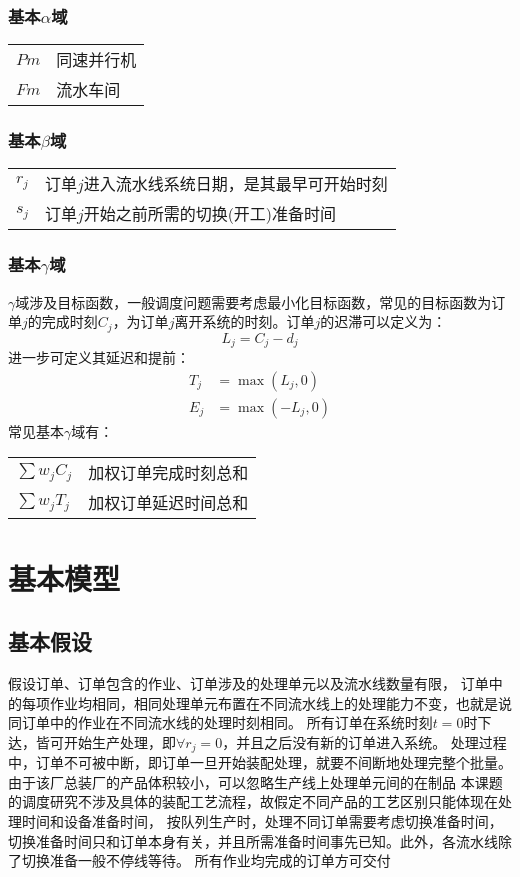 \subsubsection{基本$\alpha$域}
\begin{supertabular}{ll}
$Pm$ & 同速并行机\\
$Fm$ & 流水车间\\
\end{supertabular}

\subsubsection{基本$\beta$域}
\begin{supertabular}{ll}
$r_j$ & 订单$j$进入流水线系统日期，是其最早可开始时刻\\
$s_j$ & 订单$j$开始之前所需的切换(开工)准备时间\\
\end{supertabular}

\subsubsection{基本$\gamma$域}
$\gamma$域涉及目标函数，一般调度问题需要考虑最小化目标函数，常见的目标函数为订单$j$的完成时刻$C_j$，为订单$j$离开系统的时刻。订单$j$的迟滞可以定义为：
\[
L_j = C_j - d_j
\]
进一步可定义其延迟和提前：
\begin{align*}
T_j & = \max(L_j,0)\\
E_j & = \max(-L_j,0)
\end{align*}
常见基本$\gamma$域有：\\[3pt]
\begin{supertabular}{ll}
$\sum w_jC_j$ & 加权订单完成时刻总和 \\
$\sum w_jT_j$ & 加权订单延迟时间总和 \\
\end{supertabular}

\section{基本模型}
\subsection{基本假设}
假设订单、订单包含的作业、订单涉及的处理单元以及流水线数量有限，
订单中的每项作业均相同，相同处理单元布置在不同流水线上的处理能力不变，也就是说同订单中的作业在不同流水线的处理时刻相同。
所有订单在系统时刻$t = 0$时下达，皆可开始生产处理，即$\forall r_j =0$，并且之后没有新的订单进入系统。
处理过程中，订单不可被中断，即订单一旦开始装配处理，就要不间断地处理完整个批量。
由于该厂总装厂的产品体积较小，可以忽略生产线上处理单元间的在制品
本课题的调度研究不涉及具体的装配工艺流程，故假定不同产品的工艺区别只能体现在处理时间和设备准备时间，
按队列生产时，处理不同订单需要考虑切换准备时间，切换准备时间只和订单本身有关，并且所需准备时间事先已知。此外，各流水线除了切换准备一般不停线等待。
所有作业均完成的订单方可交付


